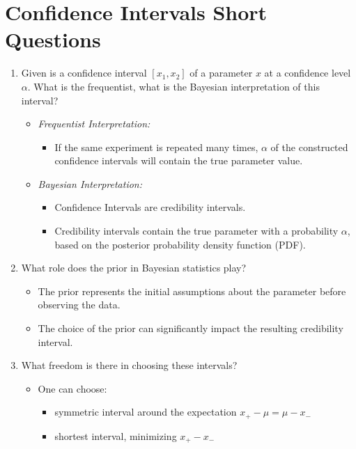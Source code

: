 \documentclass{article}
\begin{document}
\section*{Confidence Intervals Short Questions}
\begin{enumerate}
    \item Given is a confidence interval \([x_1, x_2]\) of a parameter 
    \(x\) at a confidence level \(\alpha\). What is the frequentist, 
    what is the Bayesian interpretation of this interval?
    \begin{itemize}
        \item \textit{Frequentist Interpretation:}
        \begin{itemize} 
            \item If the same experiment is repeated many times, $\alpha$ of the constructed confidence intervals will contain the true parameter value.
        \end{itemize}
        \item \textit{Bayesian Interpretation:}
        \begin{itemize}
            \item Confidence Intervals are credibility intervals. 
            \item Credibility intervals contain the true parameter with a 
            probability \(\alpha\), based on the posterior probability density 
            function (PDF).
        \end{itemize} 
    \end{itemize}
    \item What role does the prior in Bayesian statistics play?
    \begin{itemize}
        \item The prior represents the initial assumptions about the 
        parameter before observing the data.
        \item The choice of the prior can significantly impact the resulting 
        credibility interval.
    \end{itemize}
    \item What freedom is there in choosing these intervals?
    \begin{itemize}
        \item One can choose:
        \begin{itemize}
            \item symmetric interval around the expectation $x_+-\mu=\mu-x_-$ 
            \item shortest interval, minimizing $x_+-x_-$

\end{itemize}
\end{itemize}
\end{enumerate}
\end{document}
